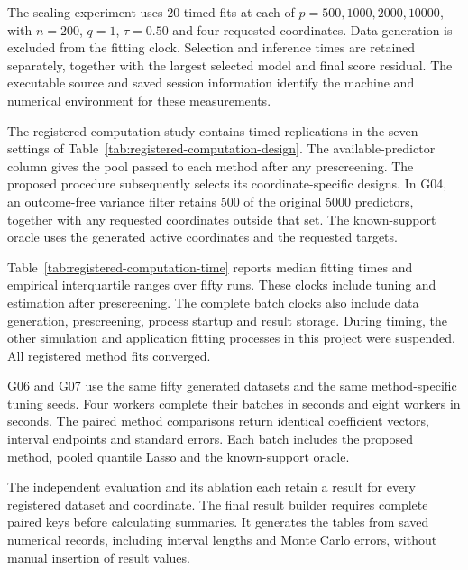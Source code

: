 The scaling experiment uses 20 timed fits at each of
$p=500,1000,2000,10000$, with $n=200$, $q=1$, $\tau=0.50$ and
four requested coordinates. Data generation is excluded from the
fitting clock. Selection and inference times are retained separately,
together with the largest selected model and final score residual.
The executable source and saved session information identify the
machine and numerical environment for these measurements.


The registered computation study contains
\SubmissionTimingReplications{} timed replications in the seven
settings of Table~\ref{tab:registered-computation-design}. The
available-predictor column gives the pool passed to each method
after any prescreening. The proposed procedure subsequently selects
its coordinate-specific designs. In G04, an outcome-free variance
filter retains 500 of the original 5000 predictors, together with
any requested coordinates outside that set. The known-support oracle
uses the generated active coordinates and the requested targets.



Table~\ref{tab:registered-computation-time} reports median fitting
times and empirical interquartile ranges over fifty runs. These
clocks include tuning and estimation after prescreening. The complete
batch clocks also include data generation, prescreening, process
startup and result storage. During timing, the other simulation and
application fitting processes in this project were suspended.
All registered method fits converged.

G06 and G07 use the same fifty generated datasets and the same
method-specific tuning seeds. Four workers complete their batches
in \SubmissionWallFour{} seconds and eight workers in
\SubmissionWallEight{} seconds. The paired method comparisons return
identical coefficient vectors, interval endpoints and standard
errors. Each batch includes the proposed method, pooled quantile
Lasso and the known-support oracle.

\begingroup\small

\endgroup

The independent evaluation and its ablation each retain a result
for every registered dataset and coordinate. The final result
builder requires complete paired keys before calculating summaries.
It generates the tables from saved numerical records, including
interval lengths and Monte Carlo errors, without manual insertion
of result values.
